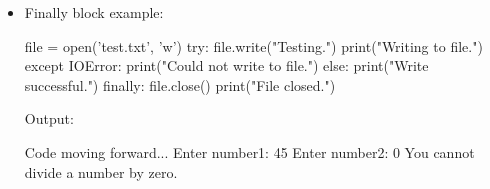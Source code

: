 \begin{flushleft}
\begin{itemize}
		\item Finally block example:
		\begin{tcolorbox}[breakable,notitle,boxrule=-0pt,colback=code,colframe=code]
			\color{white}
			\font=8pt
			file = open('test.txt', 'w')
			\newline
			try: \newline
			\hphantom{} \hphantom{} file.write("Testing.") \newline
			\hphantom{} \hphantom{} print("Writing to file.") \newline
			except IOError: \newline
			print("Could not write to file.") \newline
			else: \newline
			print("Write successful.") \newline
			finally: \newline
			file.close() \newline
			print("File closed.")
			\font=4pt
		\end{tcolorbox}
		
		Output: 
		\begin{tcolorbox}[breakable,notitle,boxrule=-0pt,colback=error,colframe=error]
			\color{black}
			Code moving forward...
			Enter number1: 45
			Enter number2: 0
			You cannot divide a number by zero.
			\font=4pt
		\end{tcolorbox}		
											
	
	\end{itemize}
	
\end{flushleft}

\newpage

